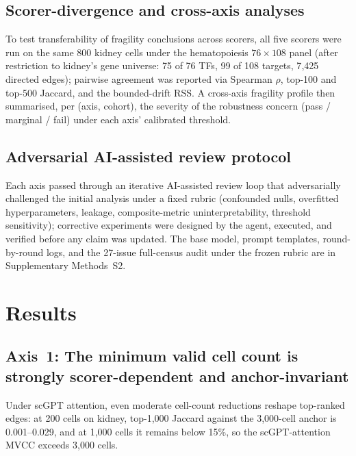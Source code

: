 \documentclass[12pt]{article}
\begin{document}
\subsection{Scorer-divergence and cross-axis analyses}

To test transferability of fragility conclusions across scorers, all
five scorers were run on the same 800 kidney cells under the
hematopoiesis $76 \times 108$ panel (after restriction to kidney's
gene universe: 75 of 76 TFs, 99 of 108 targets, 7{,}425 directed
edges); pairwise agreement was reported via Spearman $\rho$, top-100
and top-500 Jaccard, and the bounded-drift RSS. A cross-axis fragility
profile then summarised, per (axis, cohort), the severity of the
robustness concern (pass / marginal / fail) under each axis'
calibrated threshold.

\subsection{Adversarial AI-assisted review protocol}

Each axis passed through an iterative AI-assisted review loop that
adversarially challenged the initial analysis under a fixed rubric
(confounded nulls, overfitted hyperparameters, leakage, composite-metric
uninterpretability, threshold sensitivity); corrective experiments were
designed by the agent, executed, and verified before any claim was
updated. The base model, prompt templates, round-by-round logs, and the
27-issue full-census audit under the frozen rubric are in Supplementary
Methods~S2.

\section{Results}

\subsection{Axis~1: The minimum valid cell count is strongly scorer-dependent
and anchor-invariant}

Under scGPT attention, even moderate cell-count reductions reshape
top-ranked edges: at 200 cells on kidney, top-1{,}000 Jaccard against
the 3{,}000-cell anchor is 0.001--0.029, and at 1{,}000 cells it
remains below 15\%, so the scGPT-attention MVCC exceeds 3{,}000 cells.
\end{document}

